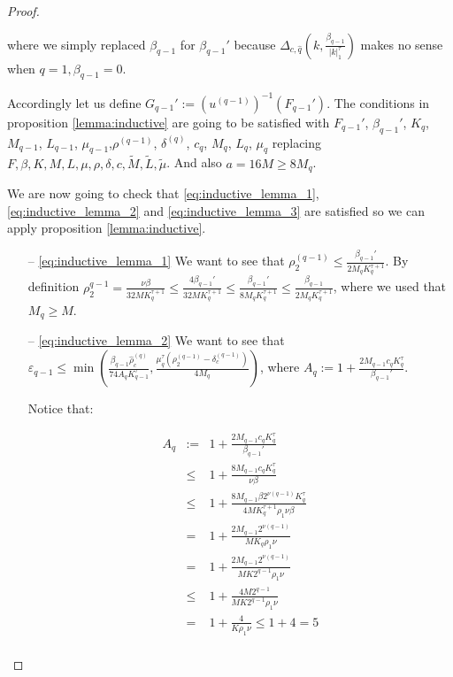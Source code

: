 \begin{proof}
\begin{enumerate}
where we simply replaced $\beta_{q-1}$ for $\beta_{q-1}'$ because $\Delta_{c,\hat q}(k,\frac{\beta_{q-1}}{|k|_1^\tau})$ makes no sense when $q=1,\beta_{q-1}=0$.

Accordingly let us define $G_{q-1}' := (u^{(q-1)})^{-1}(F_{q-1}')$. The conditions in proposition \ref{lemma:inductive} are going to be satisfied with $F_{q-1}'$, $\beta_{q-1}'$, $K_q$, $M_{q-1}$, $L_{q-1}$, $\mu_{q-1}$,$\rho^{(q-1)}$, $\delta^{(q)}$, $c_q$, $M_q$, $L_q$, $\mu_q$ replacing $F, \beta, K, M,L, \mu, \rho,\delta, c, \tilde M, \tilde L, \tilde \mu$. And also $a = 16M \geq 8M_q$.

We are now going to check that \ref{eq:inductive_lemma_1}, \ref{eq:inductive_lemma_2} and \ref{eq:inductive_lemma_3} are satisfied so we can apply proposition \ref{lemma:inductive}.
 \begin{itemize}

 \item[--] \ref{eq:inductive_lemma_1} We want to see that $\rho_2^{(q-1)}\leq \frac{\beta_{q-1}'}{2M_qK_q^{\tau+1}}$.
 By definition $\rho_2^{q-1} = \frac{\nu \beta}{32 M K_q^{\tau+1}} \leq \frac{4 \beta_{q-1}'}{32 M K_q^{\tau+1}}\leq \frac{\beta_{q-1}'}{8M_q K_q^{\tau+1}} \leq \frac{\beta_{q-1}}{2 M_q K_q^{\tau+1}}$, where we used that $M_q \geq M$.
 \item[--] \ref{eq:inductive_lemma_2} We want to see that $\varepsilon_{q-1} \leq \min \left(\frac{\beta_{q-1}\hat\rho_c^{(q)}}{74 A_q K_{q-1}^\tau}, \frac{\mu^\tau_q(\rho_2^{(q-1)}-\delta_c^{(q-1)})}{4 M_q}\right)$, where $A_q := 1 + \frac{2M_{q-1} c_q K_q^\tau}{\beta_{q-1}'}$.


 Notice that:


$$
\begin{array}{rcl}
A_q & := & 1 + \frac{2 M_{q-1} c_q K_q^\tau}{\beta_{q-1}'} \\
 & \leq & 1 + \frac{8 M_{q-1} c_q K_q^\tau}{\nu \beta}\\
 & \leq & 1 + \frac{8 M_{q-1}\beta 2^{\nu(q-1)}K_q^\tau}{4M K_q^{\tau+1}\rho_1 \nu \beta}\\
 & = & 1 + \frac{2 M_{q-1} 2 ^{\nu(q-1)}}{M K_q \rho_1 \nu} \\
 & = & 1 + \frac{2 M_{q-1} 2^{\nu(q-1)}}{M K 2^{q-1} \rho_1 \nu} \\
 & \leq & 1 + \frac{4 M 2^{q-1}}{M K 2^{q-1} \rho_1 \nu} \\
 & = & 1 + \frac{4}{K \rho_1 \nu} \leq 1 + 4 = 5\\
\end{array}
$$


\end{itemize}
\end{enumerate}
\end{proof}
